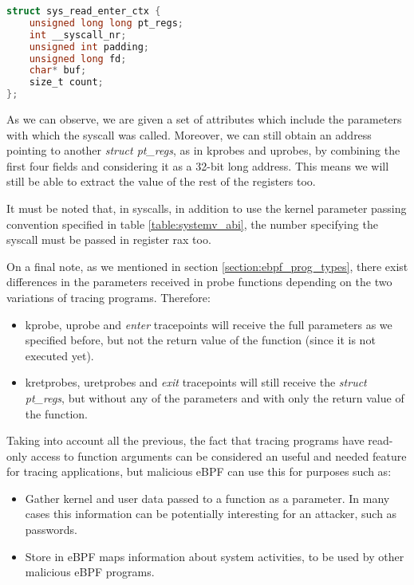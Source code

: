 \begin{lstlisting}[language=C, caption={Format of custom struct sys\_read\_enter\_ctx.}, label={code:sys_enter_read_tp}]
struct sys_read_enter_ctx {
    unsigned long long pt_regs;
    int __syscall_nr;
    unsigned int padding;
    unsigned long fd;
    char* buf;
    size_t count;
};
\end{lstlisting}

As we can observe, we are given a set of attributes which include the parameters with which the syscall was called. Moreover, we can still obtain an address pointing to another \textit{struct pt\_regs}, as in kprobes and uprobes, by combining the first four fields and considering it as a 32-bit long address. This means we will still be able to extract the value of the rest of the registers too. 

It must be noted that, in syscalls, in addition to use the kernel parameter passing convention specified in table \ref{table:systemv_abi}, the number specifying the syscall must be passed in register rax too.

On a final note, as we mentioned in section \ref{section:ebpf_prog_types}, there exist differences in the parameters received in probe functions depending on the two variations of tracing programs. Therefore:
\begin{itemize}
\item kprobe, uprobe and \textit{enter} tracepoints will receive the full parameters as we specified before, but not the return value of the function (since it is not executed yet).
\item kretprobes, uretprobes and \textit{exit} tracepoints will still receive the \textit{struct pt\_regs}, but without any of the parameters and with only the return value of the function.
\end{itemize}

Taking into account all the previous, the fact that tracing programs have read-only access to function arguments can be considered an useful and needed feature for tracing applications, but malicious eBPF can use this for purposes such as:
\begin{itemize}
\item Gather kernel and user data passed to a function as a parameter. In many cases this information can be potentially interesting for an attacker, such as passwords.
\item Store in eBPF maps information about system activities, to be used by other malicious eBPF programs.
\end{itemize}

